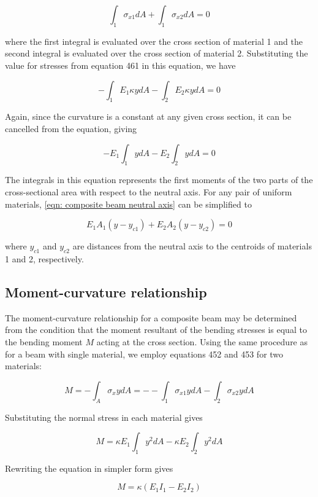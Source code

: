 \documentclass[
10pt,
a4paper,
openany,
svgnames,
]{kaobook} %
\begin{document}
\[ \int_1 \sigma_{x1}dA  + \int_1 \sigma_{x2}dA  = 0 \]

where the first integral is evaluated over the cross section of material 1 and the second integral is evaluated over the cross section of material 2. Substituting the value for stresses from equation 461 in this equation, we have

\[ - \int_1 E_1\kappa ydA  - \int_2 E_2\kappa ydA  = 0\]

Again, since the curvature is a constant at any given cross section, it can be cancelled from the equation, giving

\begin{equation} \label{eqn: composite beam neutral axis}
  -E_1\int_1 ydA  - E_2\int_2 ydA  = 0
\end{equation}

The integrals in this equation represents the first moments of the two parts of the cross-sectional area with respect to the neutral axis. For any pair of uniform materials, \cref{eqn: composite beam neutral axis} can be simplified to

\begin{equation}
  E_1A_1(y - y_{c1}) + E_2A_2(y - y_{c2}) = 0
\end{equation}

where $y_{c1}$ and $y_{c2}$ are distances from the neutral axis to the centroids of materials 1 and 2, respectively.

\subsection{Moment-curvature relationship}

The moment-curvature relationship for a composite beam may be determined from the condition that the moment resultant of the bending stresses is equal to the bending moment $M$ acting at the cross section. Using the same procedure as for a beam with single material, we employ equations 452 and 453 for two materials:

\[M =  - \int_A \sigma _xydA  =  -  - \int_1 \sigma _{x1}ydA  - \int_2 \sigma _{x2}ydA \]

Substituting the normal stress in each material gives

\[M = \kappa E_1\int_1 y^2dA  - \kappa E_2\int_2 y^2dA \]

Rewriting the equation in simpler form gives

\begin{equation}
  M = \kappa (E_1I_1 - E_2I_2)
\end{equation}
\end{document}
